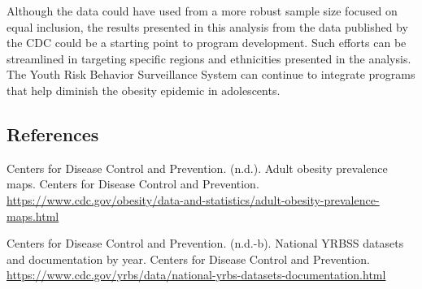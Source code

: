 \documentclass[
]{article}
\begin{document}
Although the data could have used from a more robust sample size focused
on equal inclusion, the results presented in this analysis from the data
published by the CDC could be a starting point to program development.
Such efforts can be streamlined in targeting specific regions and
ethnicities presented in the analysis. The Youth Risk Behavior
Surveillance System can continue to integrate programs that help
diminish the obesity epidemic in adolescents.

\newpage

\subsection{References}\label{references}

Centers for Disease Control and Prevention. (n.d.). Adult obesity
prevalence maps. Centers for Disease Control and Prevention.
\url{https://www.cdc.gov/obesity/data-and-statistics/adult-obesity-prevalence-maps.html}

Centers for Disease Control and Prevention. (n.d.-b). National YRBSS
datasets and documentation by year. Centers for Disease Control and
Prevention.
\url{https://www.cdc.gov/yrbs/data/national-yrbs-datasets-documentation.html}
\end{document}
